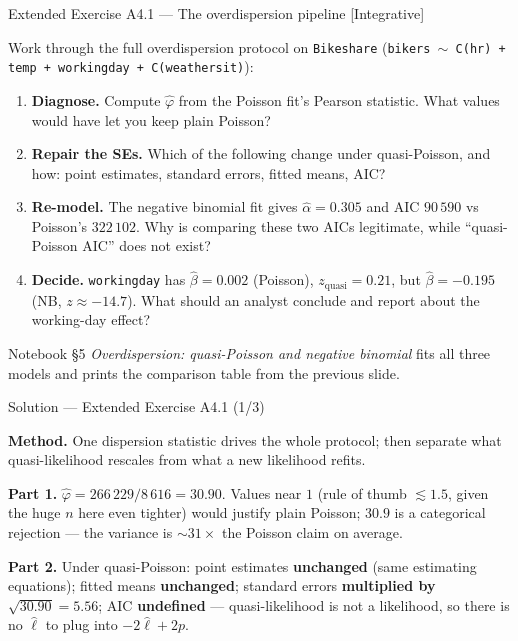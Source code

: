 \documentclass[aspectratio=169,11pt]{beamer}
\begin{document}
\begin{frame}{Extended Exercise A4.1 --- The overdispersion pipeline [Integrative]}
\begin{longexercise}
  \scriptsize
  Work through the full overdispersion protocol on \texttt{Bikeshare}
  (\texttt{bikers $\sim$ C(hr) + temp + workingday + C(weathersit)}):
  \begin{enumerate}
    \item \textbf{Diagnose.} Compute $\hat\varphi$ from the Poisson fit's Pearson
          statistic. What values would have let you keep plain Poisson?
    \item \textbf{Repair the SEs.} Which of the following change under quasi-Poisson,
          and how: point estimates, standard errors, fitted means, AIC?
    \item \textbf{Re-model.} The negative binomial fit gives $\hat\alpha = 0.305$ and
          AIC $90\,590$ vs Poisson's $322\,102$. Why is comparing these two AICs
          legitimate, while ``quasi-Poisson AIC'' does not exist?
    \item \textbf{Decide.} \texttt{workingday} has $\hat\beta = 0.002$ (Poisson),
          $z_{\text{quasi}} = 0.21$, but $\hat\beta = -0.195$ (NB, $z \approx -14.7$).
          What should an analyst conclude and report about the working-day effect?
  \end{enumerate}
\end{longexercise}
\begin{labnote}
  Notebook \S 5 \emph{Overdispersion: quasi-Poisson and negative binomial} fits all
  three models and prints the comparison table from the previous slide.
\end{labnote}
\end{frame}

\begin{frame}{Solution --- Extended Exercise A4.1 (1/3)}
\begin{solutionbox}
  \textbf{Method.} One dispersion statistic drives the whole protocol; then separate
  what quasi-likelihood rescales from what a new likelihood refits.

  \textbf{Part 1.} $\hat\varphi = 266\,229/8\,616 = 30.90$. Values near $1$
  (rule of thumb $\lesssim 1.5$, given the huge $n$ here even tighter) would justify
  plain Poisson; $30.9$ is a categorical rejection --- the variance is
  $\sim\!31\times$ the Poisson claim on average.

  \textbf{Part 2.} Under quasi-Poisson: point estimates \textbf{unchanged} (same
  estimating equations); fitted means \textbf{unchanged}; standard errors
  \textbf{multiplied by} $\sqrt{30.90}=5.56$; AIC \textbf{undefined} ---
  quasi-likelihood is not a likelihood, so there is no $\hat\ell$ to plug into
  $-2\hat\ell + 2p$.
\end{solutionbox}
\end{frame}
\end{document}

